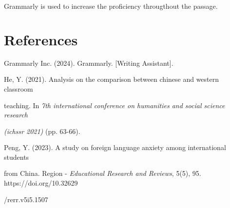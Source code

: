 \documentclass[12pt,a4paper]{article}
\begin{document}
Grammarly is used to increase the proficiency througthout the passage.

\section{References}

Grammarly Inc. (2024). Grammarly. [Writing Assistant]. \color{black}

\noindent He, Y. (2021). Analysis on the comparison between chinese and western classroom 

teaching. In \textit{7th international conference on humanities and social science research }

\textit{(ichssr 2021)} (pp. 63-66).

\noindent Peng, Y. (2023). A study on foreign language anxiety among international students 

from China. Region - \textit{Educational Research and Reviews}, 5(5), 95. \color{blue}https://doi.org/10.32629 

/rerr.v5i5.1507\color{black}
\end{document}
